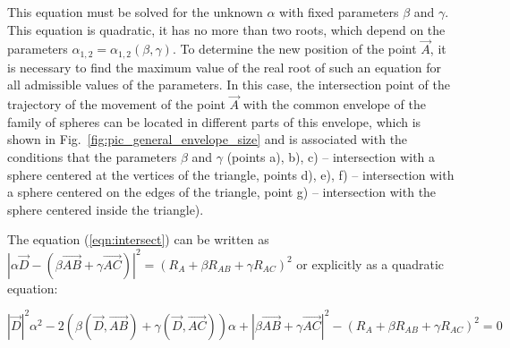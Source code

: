 \documentclass[
11pt,%
tightenlines,%
twoside,%
onecolumn,%
nofloats,%
nobibnotes,%
nofootinbib,%
superscriptaddress,%
noshowpacs,%
centertags]%
{revtex4-2}
\begin{document}
This equation must be solved for the unknown $\alpha$ with fixed parameters $\beta$ and $\gamma$.
This equation is quadratic, it has no more than two roots, which depend on the parameters $\alpha_{1,2} = \alpha_{1,2}(\beta, \gamma)$.
To determine the new position of the point $\vec{A}$, it is necessary to find the maximum value of the real root of such an equation for all admissible values of the parameters.
In this case, the intersection point of the trajectory of the movement of the point $\vec{A}$ with the common envelope of the family of spheres can be located in different parts of this envelope, which is shown in Fig.~\ref{fig:pic_general_envelope_size} and is associated with the conditions that the parameters $\beta$ and $\gamma$ (points a), b), c) -- intersection with a sphere centered at the vertices of the triangle, points d), e), f) -- intersection with a sphere centered on the edges of the triangle, point g) -- intersection with the sphere centered inside the triangle).

The equation (\ref{eqn:intersect}) can be written as $|\alpha \vec{D} - (\beta \vec{AB} + \gamma \vec{AC})|^2 = (R_A + \beta R_{AB} + \gamma R_{AC})^2$ or explicitly as a quadratic equation:

\begin{equation}
|\vec{D}|^2 \alpha^2 - 2(\beta (\vec{D}, \vec{AB}) + \gamma (\vec{D}, \vec{AC})) \alpha + |\beta \vec{AB} + \gamma \vec{AC}|^2 - (R_A + \beta R_{AB} + \gamma R_{AC})^2 = 0
\end{equation}
\end{document}

